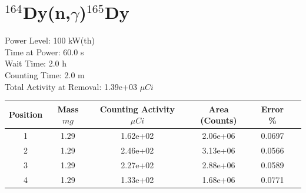\newpage

\section*{ $^{164}$Dy(n,$\gamma$)$^{165}$Dy }

Power Level: 100 kW(th) \\
Time at Power: 60.0 s \\
Wait Time:  2.0 h \\
Counting Time:  2.0 m \\
Total Activity at Removal: 1.39e+03 $\mu Ci$

\begin{table}[h]
\centering
\begin{tabular}{ |c|c|c|c|c|c| }
 \hline
 Position & Mass $mg$ & Counting Activity $\mu Ci$ & Area (Counts) & Error \% \\
 \hline 
 1 & 1.29 & 1.62e+02 & 2.06e+06 & 0.0697 \\ 
\hline
 2 & 1.29 & 2.46e+02 & 3.13e+06 & 0.0566 \\ 
\hline
 3 & 1.29 & 2.27e+02 & 2.88e+06 & 0.0589 \\ 
\hline
 4 & 1.29 & 1.33e+02 & 1.68e+06 & 0.0771 \\ 
\hline
\end{tabular}
\end{table}

